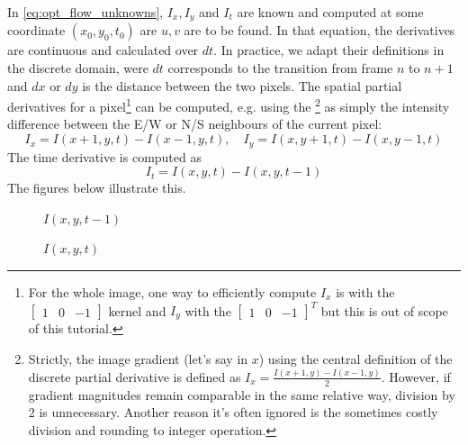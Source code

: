 \documentclass[a4paper]{article}
\begin{document}
In \eqref{eq:opt_flow_unknowns}, $I_x, I_y$ and $I_t$  are known and computed at some coordinate $(x_0,y_0,t_0)$ are $u,v$ are to be found. In that equation, the derivatives are continuous and calculated over $dt$. In practice, we adapt their definitions in the discrete domain, were $dt$ corresponds to the transition from frame $n$ to $n+1$ and $dx$ or $dy$ is the distance between the two pixels. The spatial partial derivatives for a pixel\footnote{For the whole image, one way to efficiently compute  $I_x$ is  with the $\begin{bmatrix} 1 & 0 & -1\end{bmatrix}$ kernel and $I_y$ with the $\begin{bmatrix} 1 & 0 & -1\end{bmatrix}^T$ but this is out of scope of this tutorial.} can be computed, e.g. using the \footnote{Strictly, the image gradient (let's say in $x$) using the central definition of the discrete partial derivative is defined as $I_x = \tfrac{I(x+1,y) - I(x-1,y)}{2}$. However, if gradient magnitudes remain comparable in the same relative way, division by 2 is unnecessary. Another reason it's often ignored is the sometimes costly division and rounding to integer operation.} as simply the intensity difference between the E/W or N/S neighbours of the current pixel:
\begin{equation}
    I_x = I(x+1,y,t) - I(x-1,y,t), \quad I_y =I(x,y+1,t) - I(x,y-1,t)
\end{equation}
The time derivative is computed as
\begin{equation}
    I_t = I(x,y,t) - I(x,y,t-1)
\end{equation}
The figures below illustrate this. 
\vspace{3cm}
\begin{multicols}{2}
 \begin{figure}[H]
    \centering
    
    \caption{$I(x,y,t-1)$}
\end{figure}
 \columnbreak
 \begin{figure}[H]
    \centering
    
    \caption{$I(x,y,t)$}
\end{figure}
\end{multicols}
\end{document}
